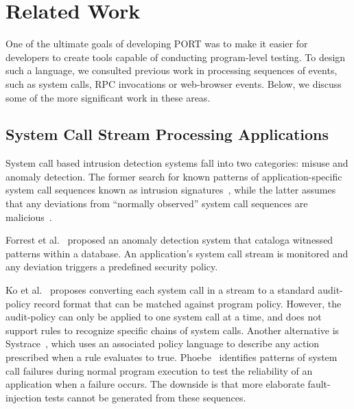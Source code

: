 \section{Related Work}
\label{SEC:related-work}

One of the ultimate goals of developing PORT
was to make it easier for developers to
create tools capable of
conducting program-level testing.
To design such a language,
we consulted
previous work
in processing sequences of events, such as
system calls, RPC invocations or
web-browser events.
Below, we discuss some of the more significant work in these areas.

\subsection{System Call Stream Processing Applications}

System call based intrusion detection systems fall into two categories: misuse and anomaly detection.
The former search for known patterns of application-specific
system call
sequences known as intrusion signatures~\cite{GARCIATEODORO200918}, while
the latter assumes that
any deviations
from ``normally observed'' system call sequences are
malicious~\cite{DBLP:conf/sp/ForrestHSL96}.

Forrest et al.~\cite{DBLP:conf/sp/ForrestHSL96} proposed 
an anomaly detection system that cataloga  witnessed patterns  within a database.
An application's system call stream
is monitored and any
deviation triggers a
predefined security policy.


Ko et al.~\cite{DBLP:conf/acsac/KoFL94} 
proposes converting each system call in a
stream to a standard audit-policy record format that can be 
matched against program policy. 
However, the audit-policy can only be applied to
one system call at a time,
and does not support rules to recognize specific chains of system calls.
Another alternative is
Systrace~\cite{DBLP:conf/uss/Provos03},
which uses an associated policy language 
to describe any action prescribed when a rule evaluates to true.
Phoebe~\cite{DBLP:journals/corr/abs-2006-04444}
identifies patterns of system call failures during normal program execution
to test the reliability of an application when a failure occurs.
The downside is that more elaborate fault-injection
tests cannot be generated from these sequences.

